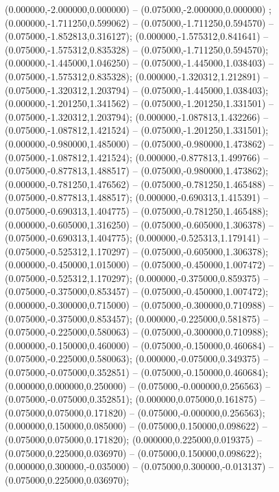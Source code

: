  (0.000000,-2.000000,0.000000) -- (0.075000,-2.000000,0.000000) ;
 (0.000000,-1.711250,0.599062) -- (0.075000,-1.711250,0.594570) -- (0.075000,-1.852813,0.316127);
 (0.000000,-1.575312,0.841641) -- (0.075000,-1.575312,0.835328) -- (0.075000,-1.711250,0.594570);
 (0.000000,-1.445000,1.046250) -- (0.075000,-1.445000,1.038403) -- (0.075000,-1.575312,0.835328);
 (0.000000,-1.320312,1.212891) -- (0.075000,-1.320312,1.203794) -- (0.075000,-1.445000,1.038403);
 (0.000000,-1.201250,1.341562) -- (0.075000,-1.201250,1.331501) -- (0.075000,-1.320312,1.203794);
 (0.000000,-1.087813,1.432266) -- (0.075000,-1.087812,1.421524) -- (0.075000,-1.201250,1.331501);
 (0.000000,-0.980000,1.485000) -- (0.075000,-0.980000,1.473862) -- (0.075000,-1.087812,1.421524);
 (0.000000,-0.877813,1.499766) -- (0.075000,-0.877813,1.488517) -- (0.075000,-0.980000,1.473862);
 (0.000000,-0.781250,1.476562) -- (0.075000,-0.781250,1.465488) -- (0.075000,-0.877813,1.488517);
 (0.000000,-0.690313,1.415391) -- (0.075000,-0.690313,1.404775) -- (0.075000,-0.781250,1.465488);
 (0.000000,-0.605000,1.316250) -- (0.075000,-0.605000,1.306378) -- (0.075000,-0.690313,1.404775);
 (0.000000,-0.525313,1.179141) -- (0.075000,-0.525312,1.170297) -- (0.075000,-0.605000,1.306378);
 (0.000000,-0.450000,1.015000) -- (0.075000,-0.450000,1.007472) -- (0.075000,-0.525312,1.170297);
 (0.000000,-0.375000,0.859375) -- (0.075000,-0.375000,0.853457) -- (0.075000,-0.450000,1.007472);
 (0.000000,-0.300000,0.715000) -- (0.075000,-0.300000,0.710988) -- (0.075000,-0.375000,0.853457);
 (0.000000,-0.225000,0.581875) -- (0.075000,-0.225000,0.580063) -- (0.075000,-0.300000,0.710988);
 (0.000000,-0.150000,0.460000) -- (0.075000,-0.150000,0.460684) -- (0.075000,-0.225000,0.580063);
 (0.000000,-0.075000,0.349375) -- (0.075000,-0.075000,0.352851) -- (0.075000,-0.150000,0.460684);
 (0.000000,0.000000,0.250000) -- (0.075000,-0.000000,0.256563) -- (0.075000,-0.075000,0.352851);
 (0.000000,0.075000,0.161875) -- (0.075000,0.075000,0.171820) -- (0.075000,-0.000000,0.256563);
 (0.000000,0.150000,0.085000) -- (0.075000,0.150000,0.098622) -- (0.075000,0.075000,0.171820);
 (0.000000,0.225000,0.019375) -- (0.075000,0.225000,0.036970) -- (0.075000,0.150000,0.098622);
 (0.000000,0.300000,-0.035000) -- (0.075000,0.300000,-0.013137) -- (0.075000,0.225000,0.036970);
